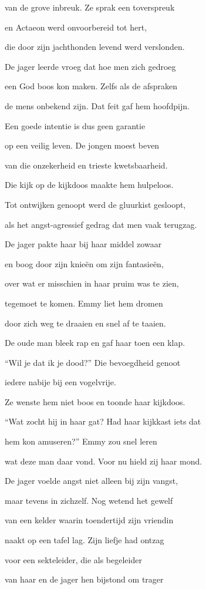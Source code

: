 van de grove inbreuk.
Ze sprak een toverspreuk

en Actaeon werd
onvoorbereid tot hert,

die door zijn jachthonden
levend werd verslonden.

De jager leerde vroeg
dat hoe men zich gedroeg

een God boos kon maken.
Zelfs als de afspraken

de mens onbekend zijn.
Dat feit gaf hem hoofdpijn.

Een goede intentie
is dus geen garantie

op een veilig leven.
De jongen moest beven

van die onzekerheid
en trieste kwetsbaarheid.

Die kijk op de kijkdoos
maakte hem hulpeloos.

Tot ontwijken genoopt
werd de gluurkist gesloopt,

als het angst-agressief gedrag
dat men vaak terugzag.

De jager pakte haar
bij haar middel zowaar

en boog door zijn knieën
om zijn fantasieën,

over wat er misschien
in haar pruim was te zien,

tegemoet te komen.
Emmy liet hem dromen

door zich weg te draaien
en snel af te taaien.

De oude man bleek rap
en gaf haar toen een klap.

“Wil je dat ik je dood?”
Die bevoegdheid genoot

iedere nabije
bij een vogelvrije.

Ze wenste hem niet boos
en toonde haar kijkdoos.

“Wat zocht hij in haar gat?
Had haar kijkkast iets dat

hem kon amuseren?”
Emmy zou snel leren

wat deze man daar vond.
Voor nu hield zij haar mond.

De jager voelde angst
niet alleen bij zijn vangst,

maar tevens in zichzelf.
Nog wetend het gewelf

van een kelder waarin
toendertijd zijn vriendin

naakt op een tafel lag.
Zijn liefje had ontzag

voor een sekteleider,
die als begeleider

van haar en de jager
hen bijstond om trager

